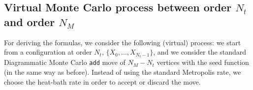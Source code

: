 \documentclass{article}
\begin{document}
\subsection{Virtual Monte Carlo process between order $N_t$ and order $N_M$}
For deriving the formulas, we consider the following (virtual) process: we start from a configuration at order $N_t$, $\{X_0,\dots,X_{N_t-1}\}$, and we consider the standard Diagrammatic Monte Carlo \texttt{add} move of $N_M-N_t$ vertices with the seed function (in the same way as before). Instead of using the standard Metropolis rate, we choose the heat-bath rate in order to accept or discard the move. 


\end{document}
